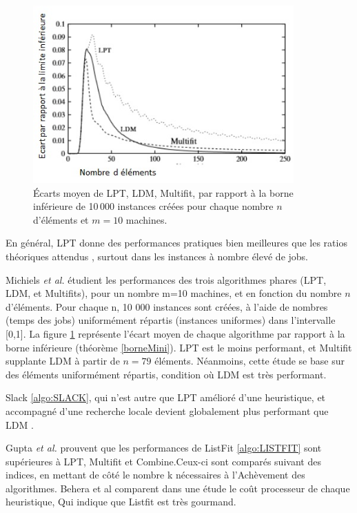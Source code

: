 \documentclass[a4paper,12pt]{report}
\theoremstyle{plain}				%
\theoremstyle{definition}				%
\begin{document}
\begin{figure}
\centering
\includegraphics[width=10cm,height=6.80cm]
{Biblio_PCmax_Rendu_CompborneInf_LPT_LDM_MULTIFIT.jpg}
\caption{Écarts moyen de LPT, LDM, Multifit, par rapport à la borne
  inférieure de 10\,000 instances créées pour chaque nombre $n$
  d'éléments et $m=10$ machines.}
\label{comparaison:LPTLDMMFBorneInf}
\end{figure}

En général, LPT donne des performances pratiques bien meilleures que
les ratios théoriques attendus \cite{della2018longest}, surtout dans
les instances à nombre élevé de jobs.

Michiels \emph{et al.}
\citep{michiels2003performance} étudient les performances des trois
algorithmes phares (LPT, LDM, et Multifits), pour un nombre m=10
machines, et en fonction du nombre $n$ d'éléments.
Pour chaque n, 10 000 instances sont créées, à l'aide de nombres
(temps des jobs) uniformément répartis (instances uniformes) dans
l'intervalle [0,1].
La figure \ref{comparaison:LPTLDMMFBorneInf} représente l'écart moyen
de chaque algorithme par rapport à la borne inférieure (théorème
\ref{borneMini}).
LPT est le moins performant, et Multifit supplante LDM à partir de
$n=79$ éléments.
Néanmoins, cette étude se base sur des éléments uniformément répartis,
condition où LDM est très performant.

Slack \ref{algo:SLACK}, qui n'est autre que LPT amélioré d'une
heuristique, et accompagné d'une recherche locale devient globalement
plus performant que LDM \cite{della2018longest}.

Gupta \emph{et al.}
prouvent que les performances de ListFit \ref{algo:LISTFIT} sont
supérieures à LPT, Multifit et Combine.Ceux-ci sont comparés
\cite{gupta2001listfit} \cite{lee1988multiprocessor} suivant des
indices, en mettant de côté le nombre k nécessaires à l’Achèvement des
algorithmes.
Behera et al \cite{behera2012comparison} comparent dans une étude le
coût processeur de chaque heuristique, Qui indique que Listfit est
très gourmand.
\end{document}
